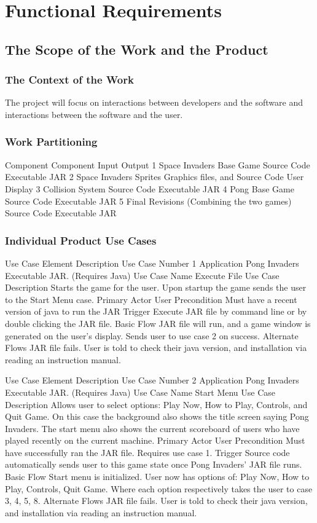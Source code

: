 \documentclass[12pt, titlepage]{article}
\begin{document}
\section{Functional Requirements}
\subsection{The Scope of the Work and the Product}
\subsubsection{The Context of the Work}
The project will focus on interactions between developers and the software and interactions between the software and the user.

\subsubsection{Work Partitioning}

Component 
Component
Input
Output
1
Space Invaders Base Game
Source Code
Executable JAR
2
Space Invaders Sprites
Graphics files, and Source Code
User Display
3
Collision System
Source Code
Executable JAR
4
Pong Base Game
Source Code
Executable JAR
5
Final Revisions (Combining the two games)
Source Code
Executable JAR

\subsubsection{Individual Product Use Cases}
Use Case Element
Description
Use Case Number
1
Application
Pong Invaders Executable JAR. (Requires Java)
Use Case Name
Execute File
Use Case Description
Starts the game for the user. Upon startup the game sends the user to the Start Menu case.
Primary Actor
User 
Precondition
Must have a recent version of java to run the JAR
Trigger
Execute JAR file by command line or by double clicking the JAR file.
Basic Flow
JAR file will run, and a game window is generated on the user’s display. Sends user to use case 2 on success.
Alternate Flows
JAR file fails. User is told to check their java version, and installation via reading an instruction manual.

Use Case Element
Description
Use Case Number
2
Application
Pong Invaders Executable JAR. (Requires Java)
Use Case Name
Start Menu
Use Case Description
Allows user to select options: Play Now, How to Play, Controls, and Quit Game. On this case the background also shows the title screen saying Pong Invaders. The start menu also shows the current scoreboard of users who have played recently on the current machine.
Primary Actor
User 
Precondition
Must have successfully ran the JAR file. Requires use case 1.
Trigger
Source code automatically sends user to this game state once Pong Invaders’ JAR file runs.
Basic Flow
Start menu is initialized. User now has options of: Play Now, How to Play, Controls, Quit Game. Where each option respectively takes the user to case 3, 4, 5, 8.
Alternate Flows
JAR file fails. User is told to check their java version, and installation via reading an instruction manual.
\end{document}
